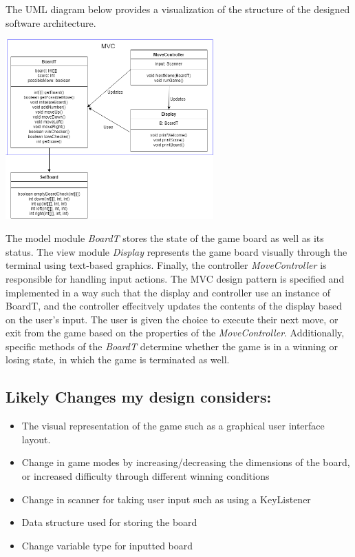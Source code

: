 \documentclass[12pt]{article}
\begin{document}
\bigskip

\noindent The UML diagram below provides a visualization of the structure of the designed software architecture.

\begin{center}
  \includegraphics[width=0.6\textwidth]{UMLA4.png}
\end{center}

\bigskip

The model module \textit{BoardT}
stores the state of the game board as well as its status. The view module \textit{Display} represents the game board visually through the terminal using text-based graphics. Finally, the controller \textit{MoveController} is responsible for handling input actions. The MVC design pattern is specified and implemented in a way such that the display and controller use an instance of BoardT, and the controller effecitvely updates the contents of the display based on the user's input. The user is given the choice to execute their next move, or exit from the game based on the properties of the \textit{MoveController}. Additionally, specific methods of the \textit{BoardT} determine whether the game is in a winning or losing state, in which the game is terminated as well. 

\newpage

\subsection*{Likely Changes my design considers:}

\begin{itemize}
  \item The visual representation of the game such as a graphical user interface layout. 
  \item Change in game modes by increasing/decreasing the dimensions of the board, or increased difficulty through different winning conditions
  \item Change in scanner for taking user input such as using a KeyListener
  \item Data structure used for storing the board
  \item Change variable type for inputted board



\end{itemize}
\end{document}
